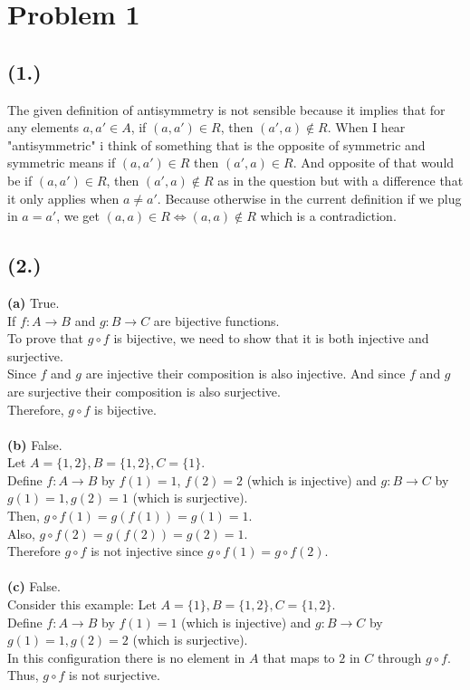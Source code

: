 \documentclass{article}
\begin{document}
\section*{Problem 1}

\subsection*{(1.)}
The given definition of antisymmetry is not sensible because it implies that for any elements \( a, a' \in A \), if \( (a, a') \in R \), then \( (a', a) \notin R \).
When I hear "antisymmetric" i think of something that is the opposite of symmetric and symmetric means if \( (a, a') \in R \) then \( (a', a) \in R \). And opposite of that would be
if \( (a, a') \in R \), then \( (a', a) \notin R \) as in the question but with a difference that it only applies when \( a \neq a' \). Because otherwise in the
current definition if we plug in \( a = a' \), we get \( (a, a) \in R \iff (a, a) \notin R \) which is a contradiction.

\subsection*{(2.)}
\textbf{(a)} True.\\
If \( f: A \to B \) and \( g: B \to C \) are bijective functions.\\
To prove that \( g \circ f \) is bijective, we need to show that it is both injective and surjective.\\
Since \(f\) and \(g\) are injective their composition is also injective. And since \(f\) and \(g\) are surjective their composition is also surjective.\\
Therefore, \( g \circ f \) is bijective.\\
\\
\textbf{(b)} False.\\
Let \( A = \{1, 2\}, B = \{1, 2\}, C = \{1\} \).\\
Define \( f: A \to B \) by \( f(1) = 1 \), \( f(2) = 2 \) (which is injective) and \( g: B \to C \) by \( g(1) = 1, g(2) = 1 \) (which is surjective).\\
Then, \( g \circ f(1) = g(f(1)) = g(1) = 1 \).\\
Also, \( g \circ f(2) = g(f(2)) = g(2) = 1 \).\\
Therefore \( g \circ f \) is not injective since \( g \circ f(1) = g \circ f(2) \).\\
\\
\textbf{(c)} False.\\
Consider this example: Let \( A = \{1\}, B = \{1, 2\}, C = \{1, 2\} \).\\
Define \( f: A \to B \) by \( f(1) = 1 \) (which is injective) and \( g: B \to C \) by \( g(1) = 1, g(2) = 2 \) (which is surjective).\\
In this configuration there is no element in \( A \) that maps to \( 2 \) in \( C \) through \( g \circ f \).\\
Thus, \( g \circ f \) is not surjective.\\
\end{document}
